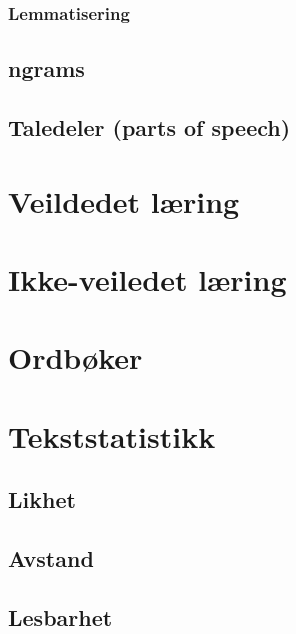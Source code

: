 \documentclass[
]{article}
\begin{document}
\hypertarget{lemmatisering}{%
\subsubsection{Lemmatisering}\label{lemmatisering}}

\hypertarget{ngrams}{%
\subsection{ngrams}\label{ngrams}}

\hypertarget{taledeler-parts-of-speech}{%
\subsection{Taledeler (parts of
speech)}\label{taledeler-parts-of-speech}}

\hypertarget{sup}{%
\section{Veildedet læring}\label{sup}}

\hypertarget{unsup}{%
\section{Ikke-veiledet læring}\label{unsup}}

\hypertarget{ordboker}{%
\section{Ordbøker}\label{ordboker}}

\hypertarget{tekststats}{%
\section{Tekststatistikk}\label{tekststats}}

\hypertarget{likhet}{%
\subsection{Likhet}\label{likhet}}

\hypertarget{avstand}{%
\subsection{Avstand}\label{avstand}}

\hypertarget{lesbarhet}{%
\subsection{Lesbarhet}\label{lesbarhet}}
\end{document}
